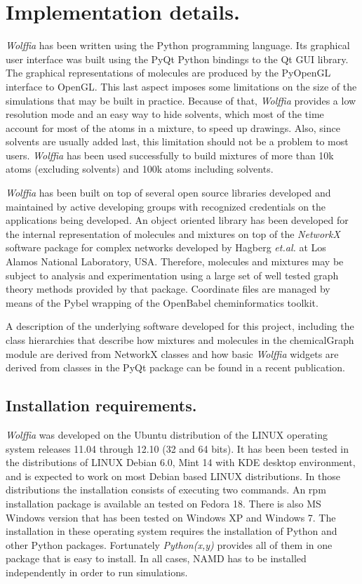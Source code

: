 \documentclass{article}
\begin{document}
\section{Implementation details.}  

\textit{Wolffia} has been written using the Python programming language.  Its graphical user interface was built using the PyQt\cite{PyQt}  Python bindings to the Qt GUI library.  The graphical representations of molecules are produced by the PyOpenGL\cite{PyOpenGL_openglpython}  interface to OpenGL.  This last aspect imposes some limitations on the size of the simulations that may be built in practice.  Because of that, \textit{Wolffia} provides a low resolution mode and an easy way to hide solvents, which most of the time account for most of the atoms in a mixture, to speed up drawings.  Also, since solvents are usually added last, this limitation should not be a problem to most users.  \textit{Wolffia} has been used successfully to build mixtures of more than 10k atoms (excluding solvents) and 100k atoms including solvents.

\textit{Wolffia} has been built on top of several open source libraries developed and maintained by active developing groups with recognized credentials on the applications being developed.
An object oriented library has been developed for the internal representation of molecules and mixtures on top of the \textit{NetworkX} software package for complex networks\cite{NetworkX} developed by Hagberg \textit{et.al.} at Los Alamos National Laboratory, USA.  Therefore, molecules and mixtures may be subject to analysis and experimentation using a large set of well tested graph theory methods provided by that package.  Coordinate files are managed by means of the Pybel wrapping of the OpenBabel cheminformatics toolkit\cite{Pybel}.

A description of the underlying software developed for this project, including the class hierarchies that describe how mixtures and molecules in the chemicalGraph module are derived from NetworkX classes and how basic \textit{Wolffia} widgets are derived from classes in the PyQt package can be found in a recent publication\cite{Wolffia01}.


\subsection{Installation requirements.}  \textit{Wolffia} was developed on the Ubuntu distribution of the LINUX operating system releases 11.04 through 12.10 (32 and 64 bits).  It has been been tested in the distributions of LINUX Debian 6.0, Mint 14 with KDE desktop environment,  and is expected to work on most Debian based LINUX distributions.  In those distributions the installation consists of executing two commands.  An rpm installation package is available an tested on Fedora 18.  There is also MS Windows version that has been tested on Windows XP and Windows 7.  The installation in these operating system requires the installation of Python and other Python packages.  Fortunately \textit{Python(x,y)} \cite{pythonxy} provides all of them in one package that is easy to install.  In all cases, NAMD has to be installed independently in order to run simulations.
\end{document}
